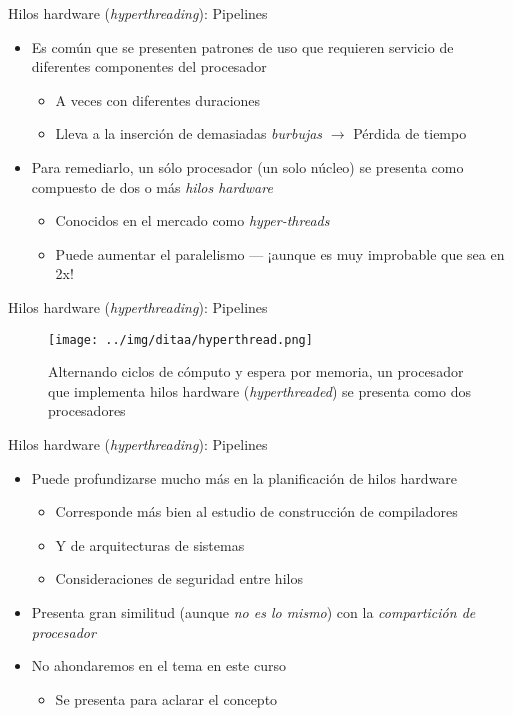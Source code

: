 \documentclass[presentation]{beamer}
\begin{document}
\begin{frame}[label={sec:org7153c0e}]{Hilos hardware (\emph{hyperthreading}): Pipelines}
\begin{itemize}
\item Es común que se presenten patrones de uso que requieren servicio de
diferentes componentes del procesador
\begin{itemize}
\item A veces con diferentes duraciones
\item Lleva a la inserción de demasiadas \emph{burbujas} \(\rightarrow\) Pérdida
de tiempo
\end{itemize}
\item Para remediarlo, un sólo procesador (un solo núcleo) se presenta
como compuesto de dos o más \emph{hilos hardware}
\begin{itemize}
\item Conocidos en el mercado como \emph{hyper-threads}
\item Puede aumentar el paralelismo — ¡aunque es muy improbable que sea
en 2x!
\end{itemize}
\end{itemize}
\end{frame}

\begin{frame}[label={sec:org5fd2000}]{Hilos hardware (\emph{hyperthreading}): Pipelines}
\begin{figure}[htbp]
\centering
\texttt{[image: ../img/ditaa/hyperthread.png]}
\caption{Alternando ciclos de cómputo y espera por memoria, un procesador que implementa hilos hardware (\emph{hyperthreaded}) se presenta como dos procesadores}
\end{figure}
\end{frame}

\begin{frame}[label={sec:org0886501}]{Hilos hardware (\emph{hyperthreading}): Pipelines}
\begin{itemize}
\item Puede profundizarse mucho más en la planificación de hilos hardware
\begin{itemize}
\item Corresponde más bien al estudio de construcción de compiladores
\item Y de arquitecturas de sistemas
\item Consideraciones de seguridad entre hilos
\end{itemize}
\item Presenta gran similitud (aunque \emph{no es lo mismo}) con la
\emph{compartición de procesador}
\item No ahondaremos en el tema en este curso
\begin{itemize}
\item Se presenta para aclarar el concepto
\end{itemize}
\end{itemize}
\end{frame}
\end{document}

